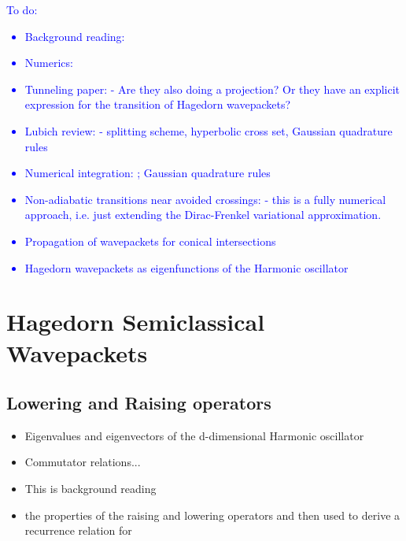 \documentclass[12pt]{article}
\numberwithin{equation}{section}
\begin{document}
    
  \tableofcontents
  \newpage
\textcolor{blue}{To do:
\begin{itemize}
  \item Background reading: \cite{hagedornRaisingLoweringOperators1998}
  \item Numerics: \cite{faouComputingSemiclassicalQuantum2009} 
  \item Tunneling paper: \cite{gradinaruTunnelingDynamicsSpawning2010}
    - Are they also doing a projection? Or they have an explicit expression 
    for the transition of Hagedorn wavepackets?
  \item Lubich review: \cite{lubichQuantumClassicalMolecular2008} - splitting scheme, 
    hyperbolic cross set, Gaussian quadrature rules
  \item Numerical integration: \cite{bourquinNumericalAlgorithmsSemiclassical2017};
    Gaussian quadrature rules 
  \item Non-adiabatic transitions near avoided crossings: 
    \cite{bourquinNonadiabaticTransitionsAvoided2012} - this is a fully numerical 
    approach, i.e. just extending the Dirac-Frenkel variational 
    approximation. 
  \item Propagation of wavepackets for conical intersections \cite{fermanian-kammererPropagationWavePackets2020}
  \item Hagedorn wavepackets as eigenfunctions of the Harmonic oscillator
\end{itemize}}
\newpage
    \section{Hagedorn Semiclassical Wavepackets}
      
      \subsection{Lowering and Raising operators}
        \begin{itemize}
          \item Eigenvalues and eigenvectors of the d-dimensional 
        Harmonic oscillator
          \item Commutator relations...
          \item This is background reading 
          \item the properties of the raising and lowering operators 
            and then used to derive a recurrence relation for 
        \end{itemize}
\end{document}
